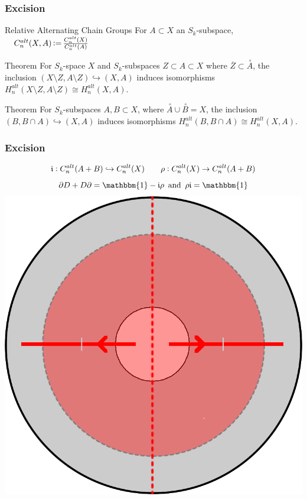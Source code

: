 \documentclass{beamer}[10pt]
\DeclareMathOperator{\coloneqq}{\vcentcolon=}
\theoremstyle{definition}
\begin{document}
\begin{frame}
\frametitle{Excision}
\centering
\begin{block}{Relative Alternating Chain Groups}
For $A\subset X$ an $S_k$-subspace, $\quad C^{alt}_n(X,A)\coloneqq \frac{C_n^{alt}(X)}{C_n^{alt}(A)}$
\end{block}
\begin{block}{Theorem}
For $S_k$-space $X$ and $S_k$-subspaces $Z\subset A\subset X$ where $\overline{Z}\subset\overset{\,\circ}A$, the inclusion $(X\setminus Z,A\setminus Z)\hookrightarrow(X,A)$ induces isomorphisms $H^{alt}_n(X\setminus Z,A\setminus Z)\cong H^{alt}_n(X,A)$.
\end{block}
\begin{block}{Theorem}
For $S_k$-subspaces $A,B\subset X$, where $\overset{\,\circ}A\cup\overset{\,\circ}B=X$, the inclusion $(B,B\cap A)\hookrightarrow(X,A)$ induces isomorphisms $H^{alt}_n(B,B\cap A)\cong H^{alt}_n(X,A)$.
\end{block}
\end{frame}

\begin{frame}
\frametitle{Excision}
\centering
$$\mathfrak{i}\vcentcolon C^{alt}_n(A+B)\hookrightarrow C^{alt}_n(X) \quad\quad \rho\vcentcolon C^{alt}_n(X)\rightarrow C^{alt}_n(A+B)$$
$$\partial D+D\partial=\mathbbm{1}-\mathfrak{i}\rho\,\text{ and }\,\rho\mathfrak{i}=\mathbbm{1}$$
\includegraphics[scale=0.15]{subdivision.png}
\end{frame}
\end{document}
